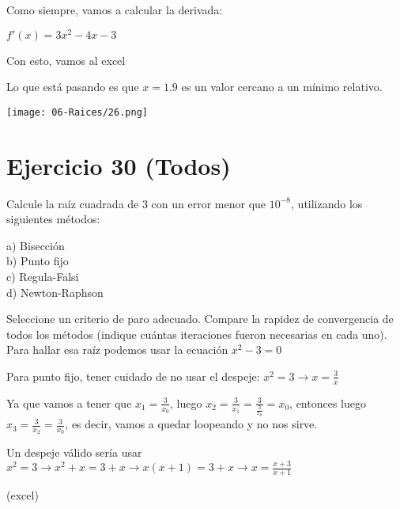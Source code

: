 \documentclass[11pt]{article}
\begin{document}
	Como siempre, vamos a calcular la derivada:
	
	$f'(x)=3x^2-4x-3$
	
	Con esto, vamos al excel
	
	Lo que está pasando es que $x=1.9$ es un valor cercano a un mínimo relativo.
	
	\texttt{[image: 06-Raices/26.png]}
	
	\section{Ejercicio 30 (Todos)}
	
	Calcule la raíz cuadrada de 3 con un error menor que $10^{-8}$, utilizando los siguientes métodos:
	
	a) Bisección\\
	b) Punto fijo\\
	c) Regula-Falsi\\
	d) Newton-Raphson
	
	Seleccione un criterio de paro adecuado. Compare la rapidez de convergencia de todos los métodos (indique cuántas iteraciones fueron necesarias en cada uno).\\
	
	Para hallar esa raíz podemos usar la ecuación $x^2-3=0$
	
	Para punto fijo, tener cuidado de no usar el despeje:
	$x^2=3 \rightarrow x=\frac{3}{x}$
	
	Ya que vamos a tener que $x_1=\frac{3}{x_0}$, luego $x_2=\frac{3}{x_1}=\frac{3}{\frac{3}{x_0}}=x_0$, entonces luego $x_3=\frac{3}{x_2}=\frac{3}{x_0}$, es decir, vamos a quedar loopeando y no nos sirve.
	
	Un despeje válido sería usar $x^2=3 \rightarrow x^2+x=3+x \rightarrow x(x+1)=3+x \rightarrow x=\frac{x+3}{x+1}$
	
	(excel)	
	
\end{document}
